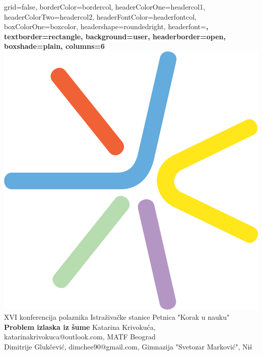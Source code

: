 \documentclass[b1paper,portrait]{template/baposter}
\begin{document}
\begin{poster}
{
	grid=false,
	borderColor=bordercol, %
	headerColorOne=headercol1, %
	headerColorTwo=headercol2, %
	headerFontColor=headerfontcol, %
	boxColorOne=boxcolor, %
	headershape=roundedright, %
	headerfont=\Large\sf\bf, %
	textborder=rectangle,
	background=user,
	headerborder=open, %
	boxshade=plain,
	columns=6
} {\includegraphics[scale=0.15]{PetLogo}}
%
%
%
%
{\small \color{white} 
	XVI konferencija polaznika Istra\v ziva\v cke stanice Petnica "Korak u nauku" \\
	\bf  \huge Problem izlaska iz \v sume
}
{\color{white} 
	\smaller Katarina Krivoku\' ca,  katarinakrivokuca@outlook.com, MATF Beograd\\
		   Dimitrije Gluk\v cevi\' c, dimchee90@gmail.com, {Gimnazija "Svetozar Markovi\' c", Ni\v s}   \\
}
\end{poster}
\end{document}
